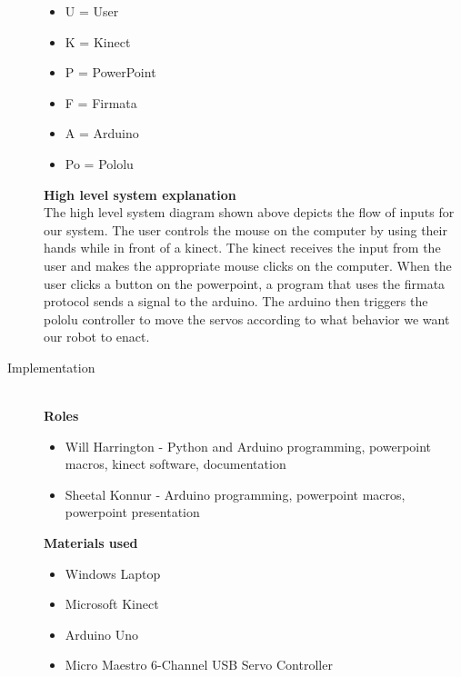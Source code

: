 \documentclass[12pt]{article}
\begin{document}
\begin{description}
\begin{tikzpicture}[thick]
		\end{tikzpicture}
		\begin{itemize}
			\item U = User
			\item K = Kinect
			\item P = PowerPoint
			\item F = Firmata
			\item A = Arduino
			\item Po = Pololu
		\end{itemize}
		\textbf{High level system explanation} \\
		The high level system diagram shown above depicts the flow of inputs for our system. The user controls the mouse on the computer by using their hands while in front of a kinect. The kinect receives the input from the user and makes the appropriate mouse clicks on the computer. When the user clicks a button on the powerpoint, a program that uses the firmata protocol sends a signal to the arduino. The arduino then triggers the pololu controller to move the servos according to what behavior we want our robot to enact. 
		\newpage
	\item[Implementation] \hfill \\
	
		\textbf{Roles}
		\begin{itemize}
			\item Will Harrington - Python  and Arduino programming, powerpoint macros, kinect software, documentation
			\item Sheetal Konnur - Arduino programming, powerpoint macros, powerpoint presentation
		\end{itemize}
		
		\textbf{Materials used}
		\begin{itemize}
			\item Windows Laptop
			\item Microsoft Kinect
			\item Arduino Uno
			\item Micro Maestro 6-Channel USB Servo Controller
		\end{itemize}
		

\end{description}
\end{document}
